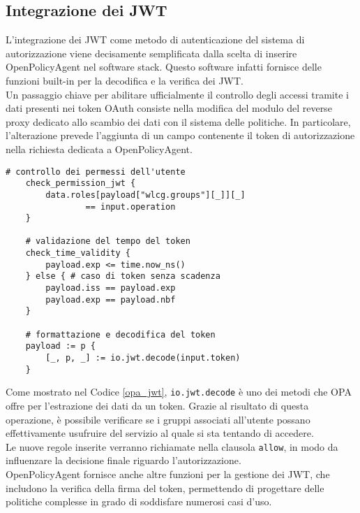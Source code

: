 \subsection{Integrazione dei JWT}
L'integrazione dei JWT come metodo di autenticazione del sistema di autorizzazione viene decisamente semplificata
dalla scelta di inserire OpenPolicyAgent nel software stack. 
Questo software infatti fornisce delle funzioni built-in per la decodifica e la verifica dei JWT.
\\ Un passaggio chiave per abilitare ufficialmente il controllo degli accessi tramite i dati presenti nei token OAuth
consiste nella modifica del modulo del reverse proxy dedicato allo scambio dei dati con il sistema delle politiche. In particolare, l'alterazione prevede 
l'aggiunta di un campo contenente il token di autorizzazione nella richiesta dedicata a OpenPolicyAgent.
\begin{lstlisting}[caption={[Regole per la gestione dei token OAuth 2.0]Regole per la gestione dei token OAuth 2.0. Dopo che il token viene decodificato, si estrae il payload e se ne controlla la validità temporale.
    Infine, se i permessi associati al ruolo corrispondono all'operazione che l'utente sta tentando di eseguire, l'accesso è consentito.},captionpos=b,label=opa_jwt]
    # controllo dei permessi dell'utente
    check_permission_jwt {
        data.roles[payload["wlcg.groups"][_]][_]
                == input.operation
    }
    
    # validazione del tempo del token 
    check_time_validity {
        payload.exp <= time.now_ns()
    } else { # caso di token senza scadenza
        payload.iss == payload.exp
        payload.exp == payload.nbf
    }
    
    # formattazione e decodifica del token
    payload := p {
        [_, p, _] := io.jwt.decode(input.token)
    }
\end{lstlisting}
Come mostrato nel Codice \ref{opa_jwt}, \texttt{io.jwt.decode} è uno dei metodi che OPA offre per l'estrazione dei dati da un token.
Grazie al risultato di questa operazione, è possibile verificare se i gruppi associati all'utente possano effettivamente usufruire del servizio al quale si sta tentando di accedere.
\\ Le nuove regole inserite verranno richiamate nella clausola \texttt{allow}, in modo da influenzare la decisione finale riguardo l'autorizzazione. 
\\ OpenPolicyAgent fornisce anche altre funzioni per la gestione dei JWT, che includono la verifica della firma del token, 
permettendo di progettare delle politiche complesse in grado di soddisfare numerosi casi d'uso. 

